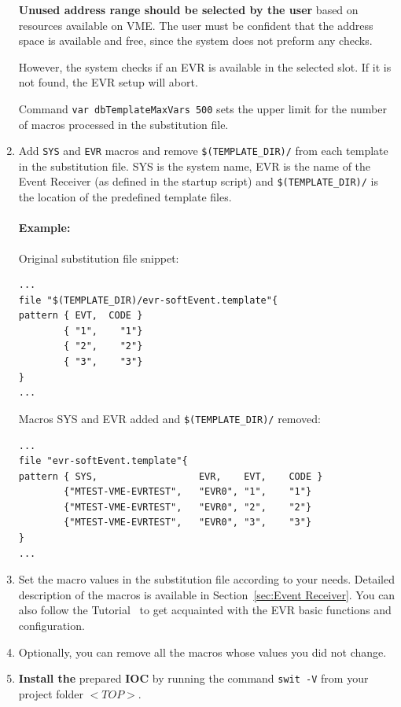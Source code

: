 \documentclass[12pt,a4paper]{article}
\begin{document}
\begin{enumerate}
  \textbf{Unused address range should be selected by the user} based on resources available on VME.
  The user must be confident that the address space is available and free, since the system does not preform any checks. 
  
  However, the system checks if an EVR is available in the selected slot. If it is not found, the EVR setup will abort.
  
  Command \texttt{var dbTemplateMaxVars 500} sets the upper limit for the number of macros processed in the substitution file.
  
\item
  Add \texttt{SYS} and \texttt{EVR} macros and remove \texttt{\$(TEMPLATE\_DIR)/} from each template in the substitution file. SYS is the system name, EVR is the name of the Event Receiver (as defined in the startup script) and \texttt{\$(TEMPLATE\_DIR)/} is the location of the predefined template files. 
  
\paragraph{Example:} 
Original substitution file snippet:

\begin{verbatim}
...
file "$(TEMPLATE_DIR)/evr-softEvent.template"{
pattern { EVT,  CODE }
        { "1",    "1"}
        { "2",    "2"}
        { "3",    "3"}
}
...
\end{verbatim}

 Macros SYS and EVR added and \texttt{\$(TEMPLATE\_DIR)/} removed:

\begin{verbatim}
...
file "evr-softEvent.template"{
pattern { SYS,                  EVR,    EVT,    CODE }
        {"MTEST-VME-EVRTEST",   "EVR0", "1",    "1"}
        {"MTEST-VME-EVRTEST",   "EVR0", "2",    "2"}
        {"MTEST-VME-EVRTEST",   "EVR0", "3",    "3"}
}
...
\end{verbatim}
\item
  Set the macro values in the substitution file according to your needs.
  Detailed description of the macros is available in Section~\ref{sec:Event Receiver}.
  You can also follow the Tutorial~\cite{tutorial} to get acquainted with the EVR basic functions and configuration.
\item
  Optionally, you can remove all the macros whose values you did not
  change.
\item
  \textbf{Install the} prepared \textbf{IOC} by running the command
  \texttt{swit -V} from your project folder $<TOP>$.
\end{enumerate}
\end{document}
